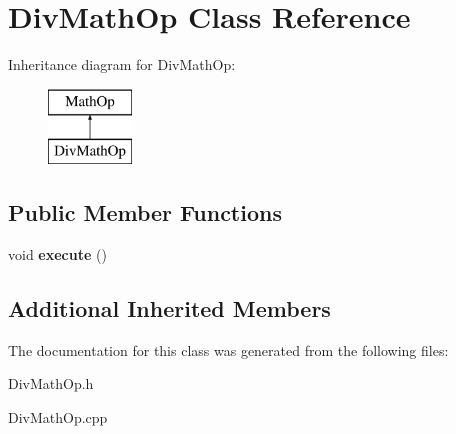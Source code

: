 \hypertarget{class_div_math_op}{}\section{Div\+Math\+Op Class Reference}
\label{class_div_math_op}
Inheritance diagram for Div\+Math\+Op\+:\begin{figure}[H]
\begin{center}
\leavevmode
\includegraphics[height=2.000000cm]{class_div_math_op}
\end{center}
\end{figure}
\subsection*{Public Member Functions}
\begin{DoxyCompactItemize}
\item 
\hypertarget{class_div_math_op_a6055c5d403e4c33fe9ab8add65749891}{}void {\bfseries execute} ()\label{class_div_math_op_a6055c5d403e4c33fe9ab8add65749891}

\end{DoxyCompactItemize}
\subsection*{Additional Inherited Members}


The documentation for this class was generated from the following files\+:\begin{DoxyCompactItemize}
\item 
Div\+Math\+Op.\+h\item 
Div\+Math\+Op.\+cpp\end{DoxyCompactItemize}
